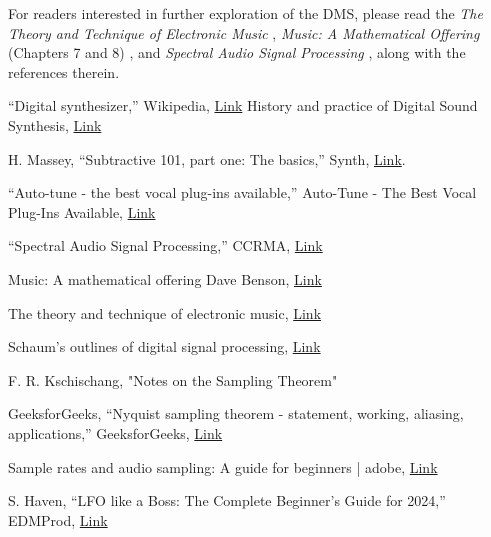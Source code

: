 \documentclass[12pt]{article}
\begin{document}
For readers interested in further exploration of the DMS, please read the \textit{The Theory and Technique of Electronic Music} \cite{TTEM}, \textit{Music: A Mathematical Offering} (Chapters 7 and 8) \cite{MAMO}, and \textit{Spectral Audio Signal Processing} \cite{SASP}, along with the references therein. 
\newpage
\begin{thebibliography}{99}  %
 “Digital synthesizer,” Wikipedia, \href{https://en.wikipedia.org/wiki/Digital_synthesizer}{Link}
 History and practice of Digital Sound Synthesis, \href{https://www.aes.org/technical/heyser/downloads/AES121heyser-Smith.pdf}{Link} 

H. Massey, “Subtractive 101, part one: The basics,” Synth,  \href{https://yamahasynth.com/learn/synth-programming/subtractive-synthesis-101-part-one-the-basics}{Link}.

 “Auto-tune - the best vocal plug-ins available,” Auto-Tune - The Best Vocal Plug-Ins Available, \href{https://www.antarestech.com/community/what-are-synths-in-music}{Link}

 “Spectral Audio Signal Processing,” CCRMA, \href{https://ccrma.stanford.edu/~jos/sasp/}{Link}

 Music: A mathematical offering Dave Benson, \href{https://logosfoundation.org/kursus/music_math.pdf}{Link}

 The theory and technique of electronic music, \href{http://msp.ucsd.edu/techniques/v0.09/book.pdf}{Link}

 Schaum’s outlines of digital signal processing, \href{https://courses.e-ce.uth.gr/CE446/schaum.pdf}{Link} 

 F. R. Kschischang, "Notes on the Sampling Theorem"

 GeeksforGeeks, “Nyquist sampling theorem - statement, working, aliasing, applications,” GeeksforGeeks, \href{https://www.geeksforgeeks.org/nyquist-sampling-theorem/}{Link}

 Sample rates and audio sampling: A guide for beginners | adobe, \href{https://www.adobe.com/uk/creativecloud/video/discover/audio-sampling.html}{Link}

 S. Haven, “LFO like a Boss: The Complete Beginner’s Guide for 2024,” EDMProd, \href{https://www.edmprod.com/lfo/}{Link} 


\end{thebibliography}
\end{document}
